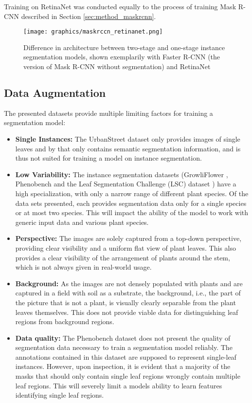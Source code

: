 \documentclass[draft,final]{vutinfth} %
\begin{document}
Training on RetinaNet was conducted equally to the process of training Mask R-CNN described in Section \ref{sec:method_maskrcnn}.

\begin{figure}[h]
    \centering
    \texttt{[image: graphics/maskrccn\_retinanet.png]}
    \caption{Difference in architecture between two-stage and one-stage instance segmentation models, shown exemplarily with Faster R-CNN (the version of Mask R-CNN without segmentation) and RetinaNet \cite{carranza-garcia_performance_2021}}
    \label{fig:maskrcnn_retinanet_arch}
\end{figure}

\subsection{Data Augmentation} \label{sec:data_aug}
The presented datasets provide multiple limiting factors for training a segmentation model:
\begin{itemize}
    \item \textbf{Single Instances:} The UrbanStreet dataset \cite{yang_urban_2023} only provides images of single leaves and by that only contains semantic segmentation information, and is thus not suited for training a model on instance segmentation.
    \item \textbf{Low Variability:} The instance segmentation datasets (GrowliFlower \cite{kierdorf_growliflower_2023}, Phenobench \cite{weyler_phenobench_2023} and the Leaf Segmentation Challenge (LSC) dataset \cite{minervini_finely-grained_2016}) have a high specialization, with only a narrow range of different plant species. Of the data sets presented, each provides segmentation data only for a single species or at most two species. This will impact the ability of the model to work with generic input data and various plant species.
    \item \textbf{Perspective:} The images are solely captured from a top-down perspective, providing clear visibility and a uniform flat view of plant leaves. This also provides a clear visibility of the arrangement of plants around the stem, which is not always given in real-world usage.
    \item \textbf{Background:} As the images are not densely populated with plants and are captured in a field with soil as a substrate, the background, i.e., the part of the picture that is not a plant, is visually clearly separable from the plant leaves themselves. This does not provide viable data for distinguishing leaf regions from background regions.
    \item \textbf{Data quality:} The Phenobench dataset \cite{weyler_phenobench_2023} does not present the quality of segmentation data necessary to train a segmentation model reliably. The annotations contained in this dataset are supposed to represent single-leaf instances. However, upon inspection, it is evident that a majority of the masks that should only contain single leaf regions wrongly contain multiple leaf regions. This will severely limit a models ability to learn features identifying single leaf regions.
\end{itemize}
\end{document}

